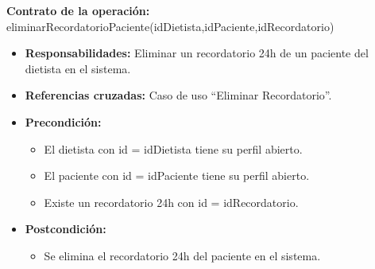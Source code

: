 \textbf{Contrato de la operación:} eliminarRecordatorioPaciente(idDietista,idPaciente,idRecordatorio)
\begin{itemize}
\item \textbf{Responsabilidades:} Eliminar un recordatorio 24h de un paciente del dietista en el sistema.
\item \textbf{Referencias cruzadas:} Caso de uso ``Eliminar Recordatorio''.
\item \textbf{Precondición:}
\begin{itemize}
\item El dietista con id = idDietista tiene su perfil abierto.
\item El paciente con id = idPaciente tiene su perfil abierto.
\item Existe un recordatorio 24h con id = idRecordatorio.
\end{itemize}
\item \textbf{Postcondición:}
\begin{itemize}
\item Se elimina el recordatorio 24h del paciente en el sistema.
\end{itemize}
\end{itemize}

